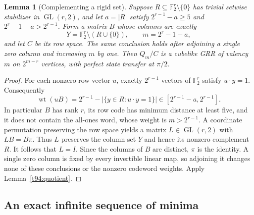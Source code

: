 \documentclass[11pt,a4paper]{article}
\newtheorem{lemma}[theorem]{Lemma}
\theoremstyle{definition}
\theoremstyle{remark}
\begin{document}
\begin{lemma}[Complementing a rigid set]
\label{t94:complement}
Suppose $R\subseteq\mathbb F_2^r\setminus\{0\}$ has trivial setwise
stabilizer in $\operatorname{GL}(r,2)$, and let $a=|R|$ satisfy
$2^{r-1}-a\ge5$ and $2^r-1-a>2^{r-1}$. Form a matrix $B$ whose columns
are exactly
\[
 Y=\mathbb F_2^r\setminus(R\cup\{0\}),\qquad m=2^r-1-a,
\]
and let $C$ be its row space. The same conclusion holds after adjoining a
single zero column and increasing $m$ by one. Then $Q_m/C$ is a cubelike GRR of valency
$m$ on $2^{m-r}$ vertices, with perfect state transfer at $\pi/2$.
\end{lemma}
\begin{proof}
For each nonzero row vector $u$, exactly $2^{r-1}$ vectors of
$\mathbb F_2^r$ satisfy $u\cdot y=1$. Consequently
\[
 \operatorname{wt}(uB)
 =2^{r-1}-|\{y\in R:u\cdot y=1\}|
 \in[2^{r-1}-a,2^{r-1}].
\]
In particular $B$ has rank $r$, its row code has minimum distance at
least five, and it does not contain the all-ones word, whose weight is
$m>2^{r-1}$. A coordinate permutation preserving the row space yields a
matrix $L\in\operatorname{GL}(r,2)$ with $LB=B\pi$. Thus $L$ preserves
the column set $Y$ and hence its nonzero complement $R$. It follows that
$L=I$. Since the columns of $B$ are distinct, $\pi$ is the identity. A single zero
column is fixed by every invertible linear map, so adjoining it changes none
of these conclusions or the nonzero codeword weights.
Apply Lemma~\ref{t94:quotient}.
\end{proof}

\subsection{An exact infinite sequence of minima}
\end{document}
